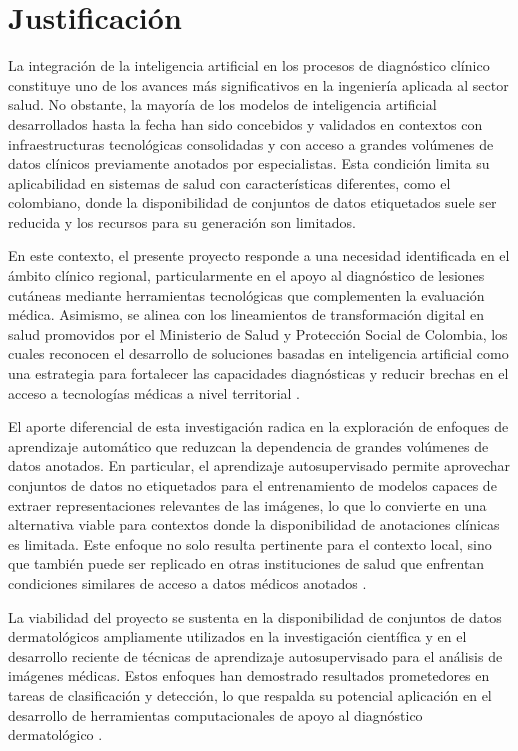 \chapter{Justificación}

La integración de la inteligencia artificial en los procesos de diagnóstico clínico constituye uno de los avances más significativos en la ingeniería aplicada al sector salud. No obstante, la mayoría de los modelos de inteligencia artificial desarrollados hasta la fecha han sido concebidos y validados en contextos con infraestructuras tecnológicas consolidadas y con acceso a grandes volúmenes de datos clínicos previamente anotados por especialistas. Esta condición limita su aplicabilidad en sistemas de salud con características diferentes, como el colombiano, donde la disponibilidad de conjuntos de datos etiquetados suele ser reducida y los recursos para su generación son limitados.

En este contexto, el presente proyecto responde a una necesidad identificada en el ámbito clínico regional, particularmente en el apoyo al diagnóstico de lesiones cutáneas mediante herramientas tecnológicas que complementen la evaluación médica. Asimismo, se alinea con los lineamientos de transformación digital en salud promovidos por el Ministerio de Salud y Protección Social de Colombia, los cuales reconocen el desarrollo de soluciones basadas en inteligencia artificial como una estrategia para fortalecer las capacidades diagnósticas y reducir brechas en el acceso a tecnologías médicas a nivel territorial \parencite{yang2024crosshospital}.

El aporte diferencial de esta investigación radica en la exploración de enfoques de aprendizaje automático que reduzcan la dependencia de grandes volúmenes de datos anotados. En particular, el aprendizaje autosupervisado permite aprovechar conjuntos de datos no etiquetados para el entrenamiento de modelos capaces de extraer representaciones relevantes de las imágenes, lo que lo convierte en una alternativa viable para contextos donde la disponibilidad de anotaciones clínicas es limitada. Este enfoque no solo resulta pertinente para el contexto local, sino que también puede ser replicado en otras instituciones de salud que enfrentan condiciones similares de acceso a datos médicos anotados \parencite{hammimou2025skinsegmentationreview}.

La viabilidad del proyecto se sustenta en la disponibilidad de conjuntos de datos dermatológicos ampliamente utilizados en la investigación científica y en el desarrollo reciente de técnicas de aprendizaje autosupervisado para el análisis de imágenes médicas. Estos enfoques han demostrado resultados prometedores en tareas de clasificación y detección, lo que respalda su potencial aplicación en el desarrollo de herramientas computacionales de apoyo al diagnóstico dermatológico \parencite{chaturvedi2020multiclassskin}.

